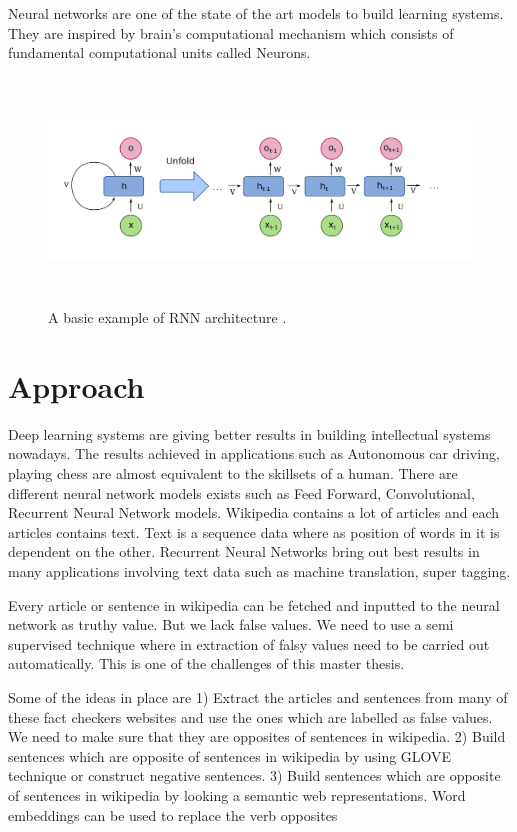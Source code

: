 \documentclass[a4paper, 11pt]{article}
\begin{document}
Neural networks are one of the state of the art models to build learning systems. They are inspired by brain's computational mechanism which consists of fundamental computational units called Neurons. 

\begin{figure}[htpb]
    \centering
    \includegraphics[width=\textwidth,height=6cm,keepaspectratio=true]
    {Recurrent_neural_network_unfold.png}
    \caption{
        A basic example of RNN architecture \cite{WikipediaEN_RNN_unfold}.
    }
    \label{fig:A basic RNN architecture}
\end{figure}



\section{Approach}

Deep learning systems are giving better results in building intellectual systems nowadays.\cite{Goldberg2016} The results achieved in applications such as Autonomous car driving, playing chess are almost equivalent to the skillsets of a human. There are different neural network models exists such as Feed Forward, Convolutional, Recurrent Neural Network models. Wikipedia contains a lot of articles and each articles contains text. Text is a sequence data where as position of words in it is dependent on the other. Recurrent Neural Networks bring out best results in many applications involving text data such as machine translation, super tagging.

Every article or sentence in wikipedia can be fetched and inputted to the neural network as truthy value. But we lack false values. We need to use a semi supervised technique where in extraction of falsy values need to be carried out automatically. This is one of the challenges of this master thesis. 

Some of the ideas in place are
1) Extract the articles and sentences from many of these fact checkers websites and use the ones which are labelled as false values. We need to make sure that they are opposites of sentences in wikipedia.
2) Build sentences which are opposite of sentences in wikipedia by using GLOVE technique or construct negative sentences. 
3) Build sentences which are opposite of sentences in wikipedia by looking a semantic web representations. Word embeddings can be used to replace the verb opposites 
\end{document}
